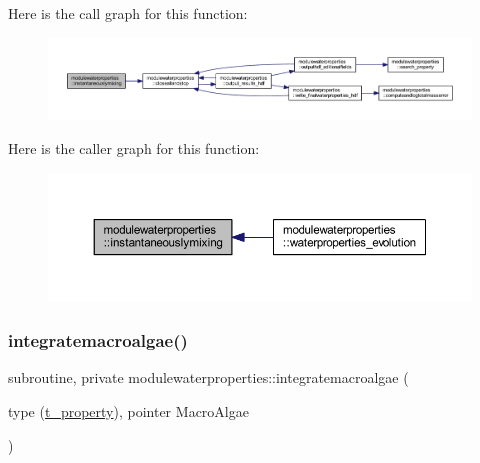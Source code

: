 Here is the call graph for this function\+:\nopagebreak
\begin{figure}[H]
\begin{center}
\leavevmode
\includegraphics[width=350pt]{namespacemodulewaterproperties_ac2912c1f90322adb405cc7d8f1d67898_cgraph}
\end{center}
\end{figure}
Here is the caller graph for this function\+:\nopagebreak
\begin{figure}[H]
\begin{center}
\leavevmode
\includegraphics[width=350pt]{namespacemodulewaterproperties_ac2912c1f90322adb405cc7d8f1d67898_icgraph}
\end{center}
\end{figure}
\mbox{\label{namespacemodulewaterproperties_a27e3b4870b21a44136c19ab777be7e33}} 
\subsubsection{\texorpdfstring{integratemacroalgae()}{integratemacroalgae()}}
{\footnotesize\ttfamily subroutine, private modulewaterproperties\+::integratemacroalgae (\begin{DoxyParamCaption}\item[{type (\mbox{\hyperlink{structmodulewaterproperties_1_1t__property}{t\+\_\+property}}), pointer}]{Macro\+Algae }\end{DoxyParamCaption})\hspace{0.3cm}{\ttfamily [private]}}

